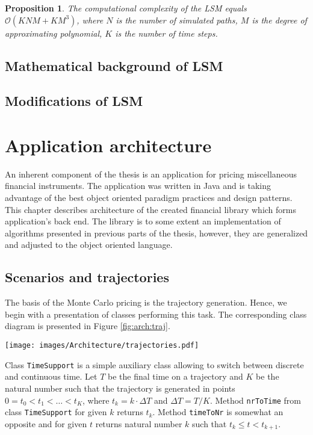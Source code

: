 \documentclass[a4paper,11pt, twoside]{book}
\newtheorem{prop}[thm]{Proposition}
\theoremstyle{definition}
\theoremstyle{remark}
\begin{document}
\begin{prop}
 The computational complexity of the LSM equals $\mathcal{O}(KNM + KM^3)$, where $N$ is the number of simulated paths, $M$ is the degree of approximating polynomial, $K$ is the number of time steps.
\end{prop}

\section{Mathematical background of LSM}
\section{Modifications of LSM}

\chapter{Application architecture}
An inherent component of the thesis is an application for pricing miscellaneous financial instruments. The application was written in Java and is taking advantage of the best object oriented paradigm practices and design patterns. This chapter describes architecture of the created financial library which forms application's back end. The library is to some extent an implementation of algorithms presented in previous parts of the thesis, however, they are generalized and adjusted to the object oriented language.

\section{Scenarios and trajectories}
The basis of the Monte Carlo pricing is the trajectory generation. Hence, we begin with a presentation of classes performing this task. The corresponding class diagram is presented in Figure \ref{fig:arch:traj}.

\begin{sidewaysfigure}
\centering
 \texttt{[image: images/Architecture/trajectories.pdf]}
\caption{Class diagram presenting classes designated for scenario generation.}
\label{fig:arch:traj}
\end{sidewaysfigure}

Class \texttt{TimeSupport} is a simple auxiliary class allowing to switch between discrete and continuous time. Let $T$ be the final time on a trajectory and $K$ be the natural number such that the trajectory is generated in points $0 = t_0 < t_1 < \ldots < t_K$, where $t_k = k \cdot \Delta T$ and $\Delta T = T / K$. Method \texttt{nrToTime} from class \texttt{TimeSupport} for given $k$ returns $t_k$. Method \texttt{timeToNr} is somewhat an opposite and for given $t$ returns natural number $k$ such that $t_k \leq t < t_{k+1}$. 
\end{document}
